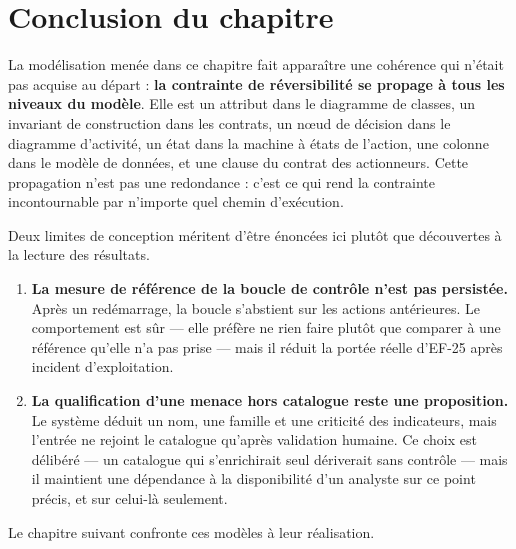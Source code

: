 \section{Conclusion du chapitre}
La mod\'elisation men\'ee dans ce chapitre fait appara\^itre une coh\'erence qui n'\'etait
pas acquise au d\'epart : \textbf{la contrainte de r\'eversibilit\'e se propage \`a tous
les niveaux du mod\`ele}. Elle est un attribut dans le diagramme de classes, un
invariant de construction dans les contrats, un n\oe ud de d\'ecision dans le
diagramme d'activit\'e, un \'etat dans la machine \`a \'etats de l'action, une colonne
dans le mod\`ele de donn\'ees, et une clause du contrat des actionneurs. Cette
propagation n'est pas une redondance : c'est ce qui rend la contrainte
incontournable par n'importe quel chemin d'ex\'ecution.

Deux limites de conception m\'eritent d'\^etre \'enonc\'ees ici plut\^ot que d\'ecouvertes \`a
la lecture des r\'esultats.

\begin{enumerate}
  \item \textbf{La mesure de r\'ef\'erence de la boucle de contr\^ole n'est pas
        persist\'ee.} Apr\`es un red\'emarrage, la boucle s'abstient sur les actions
        ant\'erieures. Le comportement est s\^ur --- elle pr\'ef\`ere ne rien faire plut\^ot
        que comparer \`a une r\'ef\'erence qu'elle n'a pas prise --- mais il r\'eduit la
        port\'ee r\'eelle d'EF-25 apr\`es incident d'exploitation.
  \item \textbf{La qualification d'une menace hors catalogue reste une
        proposition.} Le syst\`eme d\'eduit un nom, une famille et une criticit\'e des
        indicateurs, mais l'entr\'ee ne rejoint le catalogue qu'apr\`es validation
        humaine. Ce choix est d\'elib\'er\'e --- un catalogue qui s'enrichirait seul
        d\'eriverait sans contr\^ole --- mais il maintient une d\'ependance \`a la
        disponibilit\'e d'un analyste sur ce point pr\'ecis, et sur celui-l\`a seulement.
\end{enumerate}

Le chapitre suivant confronte ces mod\`eles \`a leur r\'ealisation.
